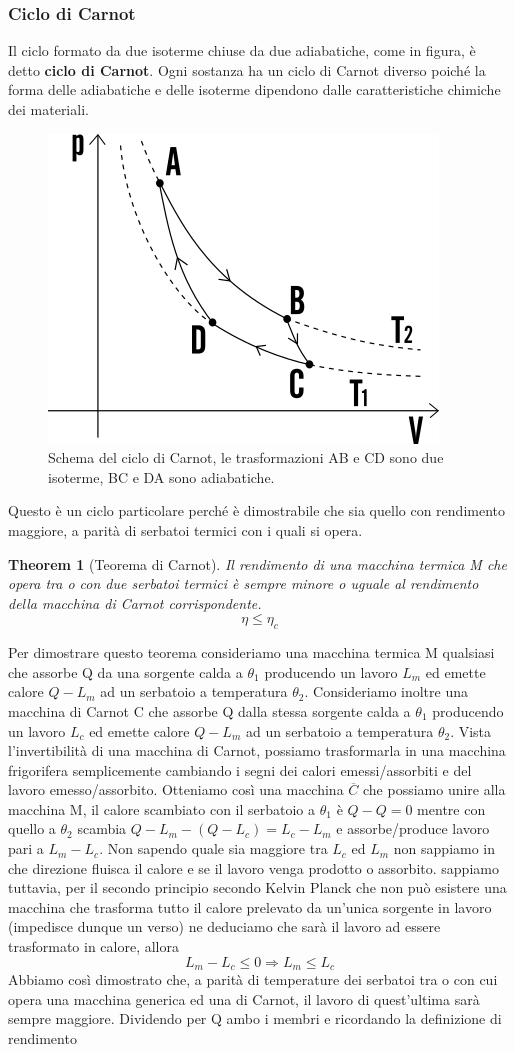 \documentclass[10pt,a4paper]{article}
\newtheorem{theorem}{Theorem}
\begin{document}
\subsubsection{Ciclo di Carnot}
Il ciclo formato da due isoterme chiuse da due adiabatiche, come in figura, è detto \textbf{ciclo di Carnot}. Ogni sostanza ha un ciclo di Carnot diverso poiché la forma delle adiabatiche e delle isoterme dipendono dalle caratteristiche chimiche dei materiali. 
\begin{figure}[h!]
	\centering
	\includegraphics[width=0.5\linewidth]{../images/ciclo_carnot}
	\caption{Schema del ciclo di Carnot, le trasformazioni AB e CD sono due isoterme, BC e DA sono adiabatiche.}
	\label{fig:ciclocarnot}
\end{figure}
\FloatBarrier
Questo è un ciclo particolare perché è dimostrabile che sia quello con rendimento maggiore, a parità di serbatoi termici con i quali si opera. 
\begin{theorem}[Teorema di Carnot]
	Il rendimento di una macchina termica M che opera tra o con due serbatoi termici è sempre minore o uguale al rendimento della macchina di Carnot corrispondente.
	\[\eta \leq \eta_c\]
\end{theorem}
Per dimostrare questo teorema consideriamo una macchina termica M qualsiasi che assorbe Q da una sorgente calda a $\theta_1$ producendo un lavoro $L_m$ ed emette calore $Q-L_m$ ad un serbatoio a temperatura $\theta_2$. Consideriamo inoltre una macchina di Carnot C che assorbe Q dalla stessa sorgente calda a $\theta_1$ producendo un lavoro $L_c$ ed emette calore $Q-L_m$ ad un serbatoio a temperatura $\theta_2$. Vista l'invertibilità di una macchina di Carnot, possiamo trasformarla in una macchina frigorifera semplicemente cambiando i segni dei calori emessi/assorbiti e del lavoro emesso/assorbito. Otteniamo così una macchina $\overline{C}$ che possiamo unire alla macchina M, il calore scambiato con il serbatoio a $\theta_1$ è \(Q-Q = 0\) mentre con quello a $\theta_2$ scambia \(Q-L_m - (Q-L_c) = L_c-L_m\) e assorbe/produce lavoro pari a \(L_m-L_c\). Non sapendo quale sia maggiore tra \(L_c\) ed \(L_m\) non sappiamo in che direzione fluisca il calore e se il lavoro venga prodotto o assorbito. sappiamo tuttavia, per il secondo principio secondo Kelvin Planck che non può esistere una macchina che trasforma tutto il calore prelevato da un'unica sorgente in lavoro (impedisce dunque un verso) ne deduciamo che sarà il lavoro ad essere trasformato in calore, allora \[L_m-L_c \leq 0 \Rightarrow L_m \leq L_c\] Abbiamo così dimostrato che, a parità di temperature dei serbatoi tra o con cui opera una macchina generica ed una di Carnot, il lavoro di quest'ultima sarà sempre maggiore. Dividendo per Q ambo i membri e ricordando la definizione di rendimento
\end{document}
